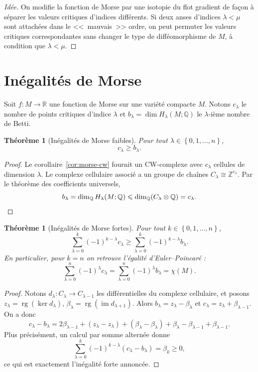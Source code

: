 \documentclass[12pt,a4paper,openany]{book}
\theoremstyle{definition}
\theoremstyle{plain}
\newtheorem{theoreme}[definition]{Théorème}
\theoremstyle{remark}
\newcommand{\Z}{\mathbb{Z}}
\newcommand{\Q}{\mathbb{Q}}
\newcommand{\R}{\mathbb{R}}
\DeclareMathOperator{\im}{im}
\DeclareMathOperator{\rg}{rg}
\newcommand{\set}[1]{\left\{#1\right\}}
\begin{document}
\begin{proof}[Idée]
On modifie la fonction de Morse par une isotopie du flot gradient de façon à
séparer les valeurs critiques d'indices différents. Si deux anses d'indices
$\lambda < \mu$ sont attachées dans le <<~mauvais~>> ordre, on peut permuter les
valeurs critiques correspondantes sans changer le type de difféomorphisme de $M$,
à condition que $\lambda < \mu$.
\end{proof}

\section{Inégalités de Morse}\label{sec:inegalites-morse}

Soit $f : M \to \R$ une fonction de Morse sur une variété compacte $M$. Notons
$c_\lambda$ le nombre de points critiques d'indice $\lambda$ et $b_\lambda = \dim H_\lambda(M; \Q)$
le $\lambda$-ième nombre de Betti.

\begin{theoreme}[Inégalités de Morse faibles]\label{thm:morse-ineg-faibles}
Pour tout $\lambda \in \set{0, 1, \ldots, n}$,
\[
  c_\lambda \geqslant b_\lambda.
\]
\end{theoreme}

\begin{proof}
Le corollaire~\ref{cor:morse-cw} fournit un CW-complexe avec $c_\lambda$
cellules de dimension $\lambda$. Le complexe cellulaire associé a un groupe de
chaînes $C_\lambda \cong \Z^{c_\lambda}$. Par le théorème des coefficients
universels,
\[
  b_\lambda = \dim_\Q H_\lambda(M;\Q) \leqslant \dim_\Q (C_\lambda \otimes \Q) = c_\lambda.
  \qedhere
\]
\end{proof}

\begin{theoreme}[Inégalités de Morse fortes]\label{thm:morse-ineg-fortes}
Pour tout $k \in \set{0, 1, \ldots, n}$,
\[
  \sum_{\lambda=0}^k (-1)^{k-\lambda} c_\lambda \geqslant
  \sum_{\lambda=0}^k (-1)^{k-\lambda} b_\lambda.
\]
En particulier, pour $k = n$ on retrouve l'égalité d'Euler--Poincaré :
\[
  \sum_{\lambda=0}^n (-1)^\lambda c_\lambda = \sum_{\lambda=0}^n (-1)^\lambda b_\lambda = \chi(M).
\]
\end{theoreme}

\begin{proof}
Notons $d_\lambda : C_\lambda \to C_{\lambda-1}$ les différentielles du complexe
cellulaire, et posons $z_\lambda = \rg(\ker d_\lambda)$,
$\beta_\lambda = \rg(\im d_{\lambda+1})$. Alors $b_\lambda = z_\lambda - \beta_\lambda$
et $c_\lambda = z_\lambda + \beta_{\lambda-1}$. On a donc
\[
  c_\lambda - b_\lambda = 2\beta_{\lambda-1} + (z_\lambda - z_\lambda) + (\beta_\lambda - \beta_\lambda) + \beta_\lambda - \beta_{\lambda-1} + \beta_{\lambda-1}.
\]
Plus précisément, un calcul par somme alternée donne
\[
  \sum_{\lambda=0}^k (-1)^{k-\lambda}(c_\lambda - b_\lambda) = \beta_k \geqslant 0,
\]
ce qui est exactement l'inégalité forte annoncée.
\end{proof}
\end{document}
